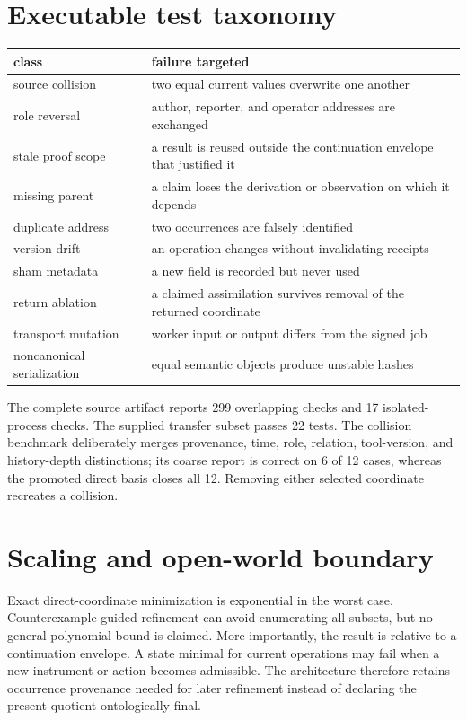 \documentclass[11pt,a4paper]{article}
\begin{document}
\section{Executable test taxonomy}
\begin{longtable}{p{.25\linewidth}p{.63\linewidth}}
\toprule
class&failure targeted\\\midrule
source collision&two equal current values overwrite one another\\
role reversal&author, reporter, and operator addresses are exchanged\\
stale proof scope&a result is reused outside the continuation envelope that justified it\\
missing parent&a claim loses the derivation or observation on which it depends\\
duplicate address&two occurrences are falsely identified\\
version drift&an operation changes without invalidating receipts\\
sham metadata&a new field is recorded but never used\\
return ablation&a claimed assimilation survives removal of the returned coordinate\\
transport mutation&worker input or output differs from the signed job\\
noncanonical serialization&equal semantic objects produce unstable hashes\\
\bottomrule
\end{longtable}

The complete source artifact reports 299 overlapping checks and 17 isolated-process checks. The supplied transfer subset passes 22 tests. The collision benchmark deliberately merges provenance, time, role, relation, tool-version, and history-depth distinctions; its coarse report is correct on 6 of 12 cases, whereas the promoted direct basis closes all 12. Removing either selected coordinate recreates a collision.

\section{Scaling and open-world boundary}
Exact direct-coordinate minimization is exponential in the worst case. Counterexample-guided refinement can avoid enumerating all subsets, but no general polynomial bound is claimed. More importantly, the result is relative to a continuation envelope. A state minimal for current operations may fail when a new instrument or action becomes admissible. The architecture therefore retains occurrence provenance needed for later refinement instead of declaring the present quotient ontologically final.
\end{document}
